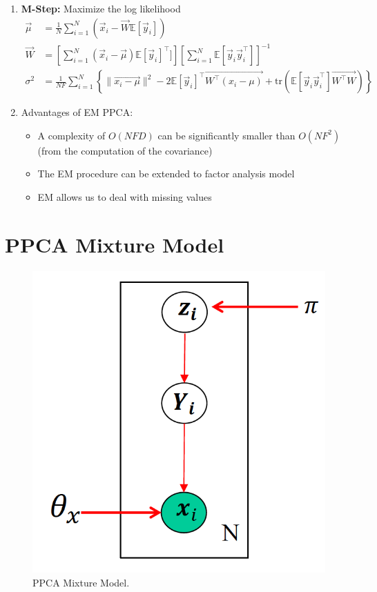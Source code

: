 \documentclass[12pt,twoside]{article}
\begin{document}
\begin{enumerate}
\item \textbf{M-Step:} Maximize the log likelihood
\begin{align*}
\vec{\mu}&= \frac{1}{N}\sum_{i=1}^N(\vec{x}_i - \vec{W}\mathbb{E}[\vec{y}_i])\\
\vec{W}&=\left[\sum_{i=1}^N (\vec{x}_i - \vec{\mu})\mathbb{E}[\vec{y}_i]^\top]\right]\left[\sum_{i=1}^N \mathbb{E}[\vec{y}_i\vec{y}_i^\top]\right]^{-1}\\
\sigma^2&=\frac{1}{NF}\sum_{i=1}^N\left\lbrace \parallel \vec{x_i-\mu} \parallel^2 -2\mathbb{E}[\vec{y}_i]^\top\vec{W^\top (x_i-\mu)} +\text{tr}(\mathbb{E}[\vec{y}_i\vec{y}_i^\top]\vec{W^\top W})\right\rbrace
\end{align*}


\item Advantages of EM PPCA:
\begin{itemize}
\item A complexity of $O(NFD)$ can be significantly smaller than $O(NF^2)$ (from the computation of the covariance)
\item The EM procedure can be extended to factor analysis model
\item EM allows us to deal with missing values
\end{itemize}

\end{enumerate}

\newpage

\section{PPCA Mixture Model}

\begin{figure}[H]
\begin{center}
\includegraphics[width = 0.4\hsize]{./figures/PPCAMixture.png} %
\caption{PPCA Mixture Model.} %
\label{fig:PPCA Mixture Model} %
\end{center}
\end{figure}
\end{document}
